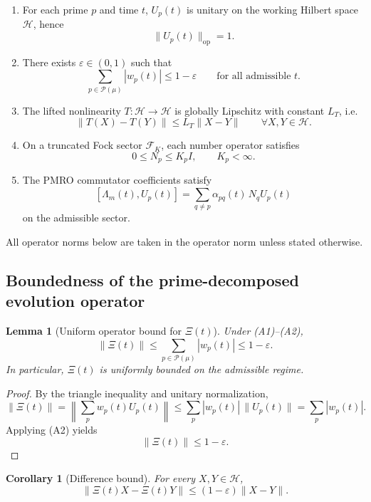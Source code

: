 \documentclass[11pt,a4paper]{article}
\theoremstyle{plain}
\newtheorem{lemma}[theorem]{Lemma}
\newtheorem{corollary}[theorem]{Corollary}
\theoremstyle{definition}
\theoremstyle{remark}
\begin{document}
\begin{enumerate}
\item[(A1)] For each prime \(p\) and time \(t\), \(U_p(t)\) is unitary on the working Hilbert space \(\mathcal H\), hence
\[
\|U_p(t)\|_{\mathrm{op}}=1.
\]

\item[(A2)] There exists \(\varepsilon\in(0,1)\) such that
\[
\sum_{p\in \mathcal P(\mu)} |w_p(t)| \le 1-\varepsilon
\qquad
\text{for all admissible } t.
\]

\item[(A3)] The lifted nonlinearity \(T:\mathcal H\to\mathcal H\) is globally Lipschitz with constant \(L_T\), i.e.
\[
\|T(X)-T(Y)\|\le L_T\|X-Y\|
\qquad
\forall X,Y\in\mathcal H.
\]

\item[(A4)] On a truncated Fock sector \(\mathcal F_K\), each number operator satisfies
\[
0\le N_p \le K_p I,
\qquad
K_p<\infty.
\]

\item[(A5)] The PMRO commutator coefficients satisfy
\[
[\Lambda_m(t),U_p(t)] = \sum_{q\ne p} \alpha_{pq}(t)\,N_q U_p(t)
\]
on the admissible sector.
\end{enumerate}

All operator norms below are taken in the operator norm unless stated otherwise.

\subsection{Boundedness of the prime-decomposed evolution operator}

\begin{lemma}[Uniform operator bound for \(\Xi(t)\)]
\label{lem:Xi_bound}
Under \textup{(A1)}--\textup{(A2)},
\[
\|\Xi(t)\|
\le
\sum_{p\in\mathcal P(\mu)} |w_p(t)|
\le
1-\varepsilon.
\]
In particular, \(\Xi(t)\) is uniformly bounded on the admissible regime.
\end{lemma}

\begin{proof}
By the triangle inequality and unitary normalization,
\[
\|\Xi(t)\|
=
\left\|
\sum_{p} w_p(t)U_p(t)
\right\|
\le
\sum_p |w_p(t)|\,\|U_p(t)\|
=
\sum_p |w_p(t)|.
\]
Applying \textup{(A2)} yields
\[
\|\Xi(t)\|\le 1-\varepsilon.
\]
\end{proof}

\begin{corollary}[Difference bound]
For every \(X,Y\in\mathcal H\),
\[
\|\Xi(t)X-\Xi(t)Y\|
\le
(1-\varepsilon)\|X-Y\|.
\]
\end{corollary}
\end{document}

